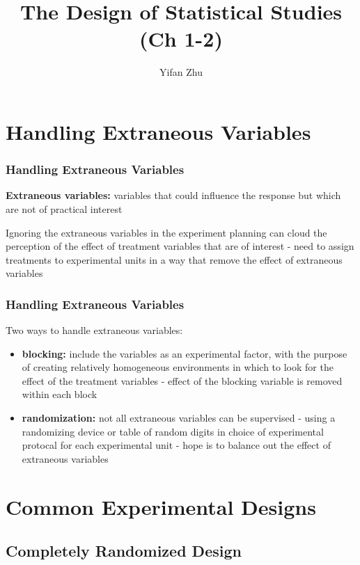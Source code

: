 \documentclass[handout]{beamer}
\title{The Design of Statistical Studies (Ch 1-2)}
\author{Yifan Zhu}
\date{}
\institute{Iowa State University}
\numberwithin{equation}{section}
\begin{document}


\begin{frame}
\titlepage
 \end{frame}
 

\section{Handling Extraneous Variables}
\begin{frame}
\frametitle{Handling Extraneous Variables}
{\bf Extraneous variables:} variables that could influence the response but which are not of practical interest

Ignoring the extraneous variables in the experiment planning can cloud the perception of the effect of treatment variables that are of interest - need to assign treatments to experimental units in a way that remove the effect of extraneous variables
\end{frame}

\begin{frame}
\frametitle{Handling Extraneous Variables}
Two ways to handle extraneous variables:

\begin{itemize}
\item 
{\bf blocking:} include the variables as an experimental factor, with the purpose of creating relatively homogeneous environments in which to look for the effect of the treatment variables - effect of the blocking variable is removed within each block

\item
{\bf randomization: } not all extraneous variables can be supervised - using a randomizing device or table of random digits in choice of experimental protocal for each experimental unit - hope is to balance out the effect of extraneous variables 
\end{itemize}
\end{frame}



\section{Common Experimental Designs}

\subsection{Completely Randomized Design}
\end{document}
